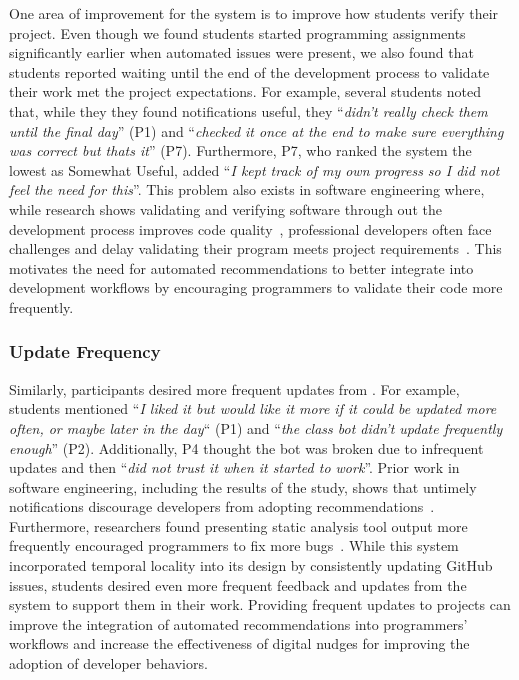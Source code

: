 One area of improvement for the \tooltwo system is to improve how students verify their project. Even though we found students started programming assignments significantly earlier when automated issues were present, we also found that students reported waiting until the end of the development process to validate their work met the project expectations. For example, several students noted that, while they they found \tooltwo notifications useful, they ``\textit{didn't really check them until the final day}'' (P1) and ``\textit{checked it once at the end to make sure everything was correct but thats it}'' (P7). Furthermore, P7, who ranked the system the lowest as Somewhat Useful, added ``\textit{I kept track of my own progress so I did not feel the need for this}''. This problem also exists in software engineering where, while research shows validating and verifying software through out the development process improves code quality~\cite{Wallace89Verification}, professional developers often face challenges and delay validating their program meets project requirements~\cite{Garcia08Ten}. This motivates the need for automated recommendations to better integrate into development workflows by encouraging programmers to validate their code more frequently.

\subsubsection{Update Frequency}

Similarly, participants desired more frequent updates from \tooltwo. For example, students mentioned ``\textit{I liked it but would like it more
if it could be updated more often, or maybe later in the day}`` (P1) and ``\textit{the class bot didn't update frequently enough}'' (P2). Additionally, P4 thought the bot was broken due to infrequent updates and then ``\textit{did not trust it when it started to work}''. Prior work in software engineering, including the results of the \tele study, shows that untimely notifications discourage developers from adopting recommendations~\cite{viriyakattiyaporn2009challenges, Sorry}. Furthermore, researchers found presenting static analysis tool output more frequently encouraged programmers to fix more bugs~\cite{Distefano2019Facebook}. While this system incorporated temporal locality into its design by consistently updating GitHub issues, students desired even more frequent feedback and updates from the system to support them in their work. Providing frequent updates to projects can improve the integration of automated recommendations into programmers' workflows and increase the effectiveness of digital nudges for improving the adoption of developer behaviors.

